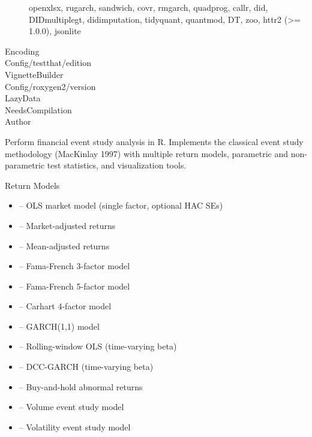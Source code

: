 \documentclass[a4paper]{book}
\begin{document}
\begin{description}
{openxlsx, rugarch, sandwich, covr, rmgarch, quadprog, callr,
did, DIDmultiplegt, didimputation, tidyquant, quantmod, DT,
zoo, httr2 (>= 1.0.0), jsonlite}
\item[Encoding]
\item[Config/testthat/edition]
\item[VignetteBuilder]
\item[Config/roxygen2/version]
\item[LazyData]
\item[NeedsCompilation]
\item[Author]
\end{description}
%
\begin{Description}
Perform financial event study analysis in R. Implements the classical
event study methodology (MacKinlay 1997) with multiple return models,
parametric and non-parametric test statistics, and visualization tools.
\end{Description}
%
\begin{Section}{Return Models}

\begin{itemize}

\item{}  -- OLS market model (single factor, optional HAC SEs)
\item{}  -- Market-adjusted returns
\item{}  -- Mean-adjusted returns
\item{}  -- Fama-French 3-factor model
\item{}  -- Fama-French 5-factor model
\item{}  -- Carhart 4-factor model
\item{}  -- GARCH(1,1) model
\item{}  -- Rolling-window OLS (time-varying beta)
\item{}  -- DCC-GARCH (time-varying beta)
\item{}  -- Buy-and-hold abnormal returns
\item{}  -- Volume event study model
\item{}  -- Volatility event study model

\end{itemize}

\end{Section}
\end{document}
